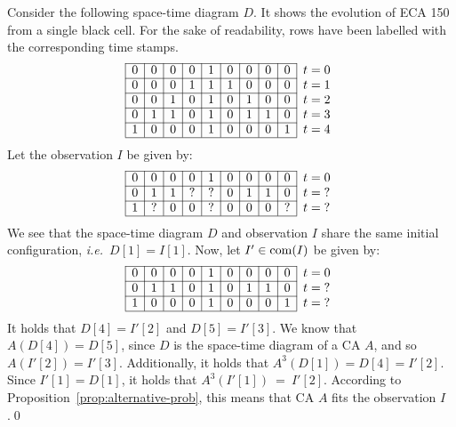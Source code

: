 \begin{example}
	Consider the following space-time diagram $D$. It shows the evolution of ECA 150 from a single black cell. For the sake of readability, rows have been labelled with the corresponding time stamps.
	\[
		\begin{array}{|c|c|c|c|c|c|c|c|c|l}
			\cline{1-9}
			0 & 0 & 0 & 0 & 1 & 0 & 0 & 0 & 0 & t=0 \\\cline{1-9}
			0 & 0 & 0 & 1 & 1 & 1 & 0 & 0 & 0 & t=1 \\\cline{1-9}
			0 & 0 & 1 & 0 & 1 & 0 & 1 & 0 & 0 & t=2 \\\cline{1-9}
			0 & 1 & 1 & 0 & 1 & 0 & 1 & 1 & 0 & t=3 \\\cline{1-9}
			1 & 0 & 0 & 0 & 1 & 0 & 0 & 0 & 1 & t=4 \\\cline{1-9}
		\end{array}
	\]
	Let the observation $I$ be given by:
	\[
		\begin{array}{|c|c|c|c|c|c|c|c|c|l}\cline{1-9}
			0 & 0 & 0 & 0 & 1 & 0 & 0 & 0 & 0 & t = 0  \\\cline{1-9}
			0 & 1 & 1 & ? & ? & 0 & 1 & 1 & 0 & t ={}? \\\cline{1-9}
			1 & ? & 0 & 0 & ? & 0 & 0 & 0 & ? & t ={}? \\\cline{1-9}
		\end{array}
	\]
	We see that the space-time diagram $D$ and observation $I$ share the same initial configuration, \emph{i.e.}\ $D[1] = I[1]$.
	Now, let $I'\in\operatorname{com}(I)$ be given by:
	\[
		\begin{array}{|c|c|c|c|c|c|c|c|c|l}\cline{1-9}
			0 & 0 & 0 & 0 & 1 & 0 & 0 & 0 & 0 & t = 0  \\\cline{1-9}
			0 & 1 & 1 & 0 & 1 & 0 & 1 & 1 & 0 & t ={}? \\\cline{1-9}
			1 & 0 & 0 & 0 & 1 & 0 & 0 & 0 & 1 & t ={}? \\\cline{1-9}
		\end{array}
	\]
	It holds that $D[4] = I'[2]$ and $D[5] = I'[3]$. We know that $A(D[4]) = D[5]$, since $D$ is the space-time diagram of a CA $A$, and so $A(I'[2]) = I'[3]$. Additionally, it holds that $A^3(D[1]) = D[4] = I'[2]$. Since $I'[1] = D[1]$, it holds that $A^3(I'[1])~=~I'[2]$. According to Proposition~\ref{prop:alternative-prob}, this means that CA $A$ fits the observation $I$.\qed%
\end{example}

